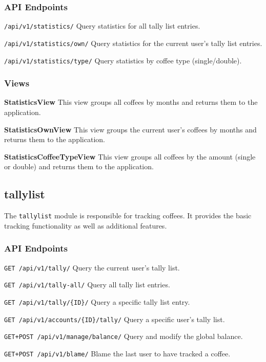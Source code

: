 \subsubsection{API Endpoints}\label{api-endpoints-2}

\texttt{/api/v1/statistics/} Query statistics for all tally list
entries.

\texttt{/api/v1/statistics/own/} Query statistics for the current user's
tally list entries.

\texttt{/api/v1/statistics/type/} Query statistics by coffee type
(single/double).

\subsubsection{Views}\label{views-4}

\textbf{StatisticsView} This view groups all coffees by months and
returns them to the application.

\textbf{StatisticsOwnView} This view groups the current user's coffees
by months and returns them to the application.

\textbf{StatisticsCoffeeTypeView} This view groups all coffees by the
amount (single or double) and returns them to the application.

\subsection{tallylist}\label{tallylist}

The \texttt{tallylist} module is responsible for tracking coffees. It
provides the basic tracking functionality as well as additional
features.

\subsubsection{API Endpoints}\label{api-endpoints-3}

\texttt{GET\ /api/v1/tally/} Query the current user's tally list.

\texttt{GET\ /api/v1/tally-all/} Query all tally list entries.

\texttt{GET\ /api/v1/tally/\{ID\}/} Query a specific tally list entry.

\texttt{GET\ /api/v1/accounts/\{ID\}/tally/} Query a specific user's
tally list.

\texttt{GET+POST\ /api/v1/manage/balance/} Query and modify the global
balance.

\texttt{GET+POST\ /api/v1/blame/} Blame the last user to have tracked a
coffee.

